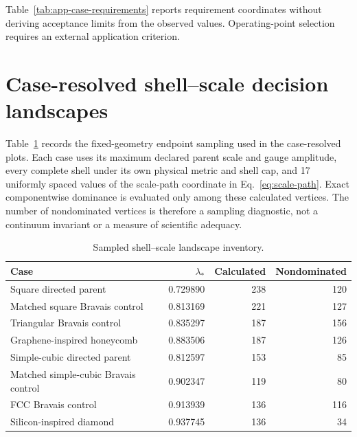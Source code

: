 Table~\ref{tab:app-case-requirements} reports requirement coordinates without deriving
acceptance limits from the observed values. Operating-point selection requires an
external application criterion.

\section{Case-resolved shell--scale decision landscapes}
\label{app:case-decision-landscapes}

Table~\ref{tab:app-decision-landscape-inventory} records the fixed-geometry endpoint
sampling used in the case-resolved plots. Each case uses its maximum declared parent
scale and gauge amplitude, every complete shell under its own physical metric and shell
cap, and 17 uniformly spaced values of the scale-path coordinate in
Eq.~\eqref{eq:scale-path}. Exact componentwise dominance is evaluated only among these
calculated vertices. The number of nondominated vertices is therefore a sampling
diagnostic, not a continuum invariant or a measure of scientific adequacy.

\begin{table}[htbp]
\centering
\small
\caption{Sampled shell--scale landscape inventory.}
\label{tab:app-decision-landscape-inventory}
\begin{tabular}{@{}lrrr@{}}
\toprule
Case & $\lambda_*$ & Calculated & Nondominated \\
\midrule
Square directed parent & 0.729890 & 238 & 120 \\
Matched square Bravais control & 0.813169 & 221 & 127 \\
Triangular Bravais control & 0.835297 & 187 & 156 \\
Graphene-inspired honeycomb & 0.883506 & 187 & 126 \\
Simple-cubic directed parent & 0.812597 & 153 & 85 \\
Matched simple-cubic Bravais control & 0.902347 & 119 & 80 \\
FCC Bravais control & 0.913939 & 136 & 116 \\
Silicon-inspired diamond & 0.937745 & 136 & 34 \\
\bottomrule
\end{tabular}
\end{table}

